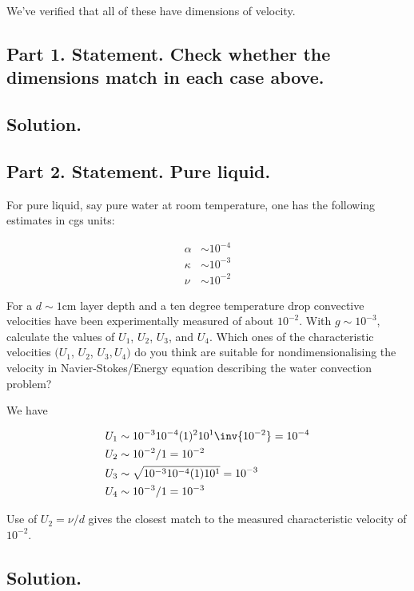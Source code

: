 We've verified that all of these have dimensions of velocity.

\subsection{Part 1.  Statement.  Check whether the dimensions match in each case above.}
\subsection{Solution.}

\subsection{Part 2.  Statement. Pure liquid.}

For pure liquid, say pure water at room temperature, one has the following estimates in cgs units:

\begin{align*}
\alpha &\sim 10^{-4} \\
\kappa &\sim 10^{-3} \\
\nu &\sim 10^{-2}
\end{align*}

For a $d \sim 1 \text{cm}$ layer depth and a ten degree temperature drop convective velocities have been experimentally measured of about $10^{-2}$.
With $g \sim 10^{-3}$, calculate the values of $U_1$, $U_2$, $U_3$, and $U_4$.  Which ones of the characteristic velocities $(U_1$, $U_2$, $U_3, U_4)$ do you think are suitable for nondimensionalising the velocity in Navier-Stokes/Energy equation describing the water convection problem?

We have

\begin{align}\label{eqn:continuumProblemSet3:190}
U_1 &\sim 10^{-3} 10^{-4} (1)^2 10^1 \inv{10^{-2}} = 10^{-4} \\
U_2 &\sim 10^{-2}/1 = 10^{-2} \\
U_3 &\sim \sqrt{ 10^{-3} 10^{-4} (1) 10^1 } = 10^{-3} \\
U_4 &\sim 10^{-3}/1 = 10^{-3}
\end{align}

Use of $U_2 = \nu/d$ gives the closest match to the measured characteristic velocity of $10^{-2}$.

\subsection{Solution.}

